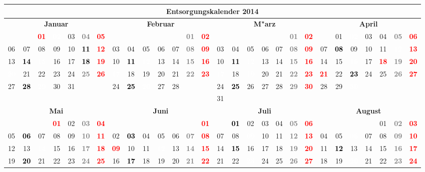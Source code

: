 \documentclass[10pt,a4paper,landscape]{article}
\newcommand{\bb}[1]{\cellcolor{MidnightBlue}\textcolor{white}{\bf #1}}
\newcommand{\gb}[1]{\cellcolor{SpringGreen}\textcolor{black}{\bf #1}}
\newcommand{\yb}[1]{\cellcolor{yellow}\textcolor{black}{\bf #1}}
\newcommand{\iv}[1]{\cellcolor{black}\textcolor{white}{\bf #1}}
\newcommand{\rb}[1]{\textbf{\textcolor{red}{#1}}}
\newcommand{\hv}[1]{\textbf{\textcolor{Gray}{#1}}}
\begin{document}
\begin{tabular}{|ccccccc|ccccccc|ccccccc|ccccccc|}
\hline
\multicolumn{28}{|c|}{\textbf{Entsorgungskalender 2014}} \\\hline
\multicolumn{7}{|c|}{\bf Januar} & \multicolumn{7}{|c|}{\bf Februar} & \multicolumn{7}{|c|}{\bf M"arz} & \multicolumn{7}{|c|}{\bf April} \\
& & \rb{01} & \iv{02} & 03 & \hv{04} & \rb{05} & & & & & & \hv{01} & \rb{02} & & & & & & \hv{01} & \rb{02} &  & 01 & \iv{02} & 03 & 04 & \hv{05} & \rb{06} \\
06 & 07 & 08 & 09 & 10 & \gb{11} & \rb{12} & 03 & 04 & 05 & 06 & 07 & \hv{08} & \rb{09} & 03 & 04 & 05 & 06 & 07 & \hv{08} & \rb{09} & 07 & \yb{08} & 09 & 10 & 11 & \bb{12} & \rb{13} \\
13 & \yb{14} & \iv{15} & 16 & 17 & \gb{18} & \rb{19} & 10 & \yb{11} & \iv{12} & 13 & 14 & \hv{15} & \rb{16} & 10 & \yb{11} & \iv{12} & 13 & 14 & \hv{15} & \rb{16} & 14 & 15 & \iv{16} & 17 & \rb{18} & \hv{19} & \rb{20} \\
\bb{20} & 21 & 22 & 23 & 24 & \hv{25} & \rb{26} & \bb{17} & 18 & 19 & 20 & 21 & \hv{22} & \rb{23} & \bb{17} & 18 & \iv{19} & 20 & 21 & \hv{22} & \rb{23} & \rb{21} & 22 & \yb{23} & 24 & 25 & \hv{26} & \rb{27} \\
27 & \yb{28} & \iv{29} & 30 & 31 & & & 24 & \yb{25} & \iv{26} & 27 & 28 & & & 24 & \yb{25} & 26 & 27 & 28 & \hv{29} & \rb{30} & 28 & 29 & \iv{30} &  &  &  &  \\
& & & & & & & & & & & & & & 31 & & & & & & &  &  &  &  &  &  &  \\
\hline
\multicolumn{7}{|c|}{\bf Mai} & \multicolumn{7}{|c|}{\bf Juni} & \multicolumn{7}{|c|}{\bf Juli} & \multicolumn{7}{|c|}{\bf August} \\
& & & \rb{01} & 02 & \hv{03} & \rb{04} & & & & & & & \rb{01} & & \yb{01} & 02 & 03 & 04 & \hv{05} & \rb{06} & & & & & 01 & \hv{02} & \rb{03} \\
05 & \yb{06} & 07 & 08 & 09 & \hv{10} & \rb{11} & 02 & \yb{03} & 04 & 05 & 06 & \hv{07} & \rb{08} & 07 & 08 & \iv{09} & 10 & 11 & \hv{12} & \rb{13} & 04 & 05 & \iv{06} & 07 & 08 & \hv{09} & \rb{10} \\
12 & 13 & \iv{14} & 15 & 16 & \hv{17} & \rb{18} & \rb{09} & 10 & 11 & \iv{12} & 13 & \hv{14} & \rb{15} & 14 & \yb{15} & 16 & 17 & 18 & \hv{19} & \rb{20} & 11 & \yb{12} & 13 & 14 & 15 & \hv{16} & \rb{17} \\
19 & \yb{20} & 21 & 22 & 23 & \hv{24} & \rb{25} & 16 & \yb{17} & 18 & 19 & 20 & \hv{21} & \rb{22} & 21 & 22 & \iv{23} & 24 & 25 & \hv{26} & \rb{27} & 18 & 19 & \iv{20} & 21 & 22 & \hv{23} & \rb{24} \\

\end{tabular}
\end{document}
